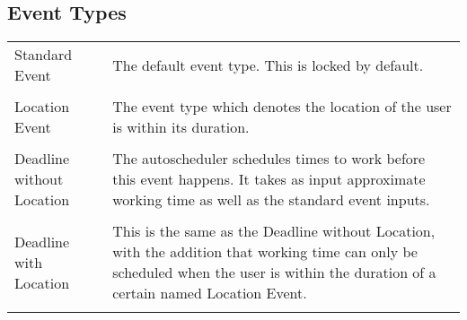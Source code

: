 \documentclass{scrreprt}
\begin{document}
\subsection{Event Types}
\begin{center}
\begin{tabular}{ p{2cm} p{13cm} }
Standard Event &
The default event type. This is locked by default.\\
\\
Location Event &
The event type which denotes the location of the user is within its duration.\\
\\
Deadline without Location &
The autoscheduler schedules times to work before this event happens. It takes as input
approximate working time as well as the standard event inputs.\\
\\
Deadline with Location &
This is the same as the Deadline without Location, with the addition 
that working time can only be scheduled when the user is within the duration of a certain named Location Event.\\
\\
\end{tabular}
\end{center}
\end{document}

